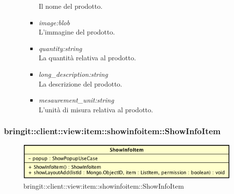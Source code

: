 \begin{itemize}
\begin{itemize}
\begin{itemize}
			Il nome del prodotto.
			\item \textit{image:blob}\\
			L'immagine del prodotto.
			\item \textit{quantity:string}\\
			La quantità relativa al prodotto.
			\item \textit{long\_description:string}\\
			La descrizione del prodotto.
			\item \textit{mesaurement\_unit:string}\\
			L'unità di misura relativa al prodotto.
					\end{itemize}
	\end{itemize}
\end{itemize}

\subsubsection{bringit::client::view:item::showinfoitem::ShowInfoItem}

\label{bringit::client::view:item::showinfoitem::ShowInfoItem}
\begin{figure}[H]
	\centering
	\includegraphics[scale=0.5]{Sezioni/SottosezioniST/img/app/ShowInfoItem.png}
	\caption{bringit::client::view:item::showinfoitem::ShowInfoItem}
\end{figure}

